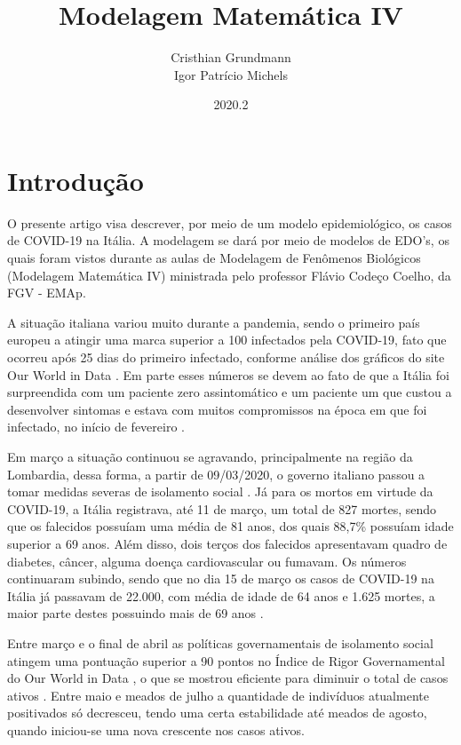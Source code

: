 \documentclass{article}
\title{Modelagem Matemática IV}
\author{Cristhian Grundmann \\
Igor Patrício Michels}
\date{2020.2}
\begin{document}
\maketitle

\section{Introdução}

O presente artigo visa descrever, por meio de um modelo epidemiológico, os casos de COVID-19 na Itália. A modelagem se dará por meio de modelos de EDO's, os quais foram vistos durante as aulas de Modelagem de Fenômenos Biológicos (Modelagem Matemática IV) ministrada pelo professor Flávio Codeço Coelho, da FGV - EMAp.

A situação italiana variou muito durante a pandemia, sendo o primeiro país europeu a atingir uma marca superior a 100 infectados pela COVID-19, fato que ocorreu após 25 dias do primeiro infectado, conforme análise dos gráficos do site Our World in Data \cite{owid}. Em parte esses números se devem ao fato de que a Itália foi surpreendida com um paciente zero assintomático e um paciente um que custou a desenvolver sintomas e estava com muitos compromissos na época em que foi infectado, no início de fevereiro \cite{dn}\cite{cm}.

Em março a situação continuou se agravando, principalmente na região da Lombardia, dessa forma, a partir de 09/03/2020, o governo italiano passou a tomar medidas severas de isolamento social \cite{piccolomini}. Já para os mortos em virtude da COVID-19, a Itália registrava, até 11 de março, um total de 827 mortes, sendo que os falecidos possuíam uma média de 81 anos, dos quais 88,7\% possuíam idade superior a 69 anos. Além disso, dois terços dos falecidos apresentavam quadro de diabetes, câncer, alguma doença cardiovascular ou fumavam. Os números continuaram subindo, sendo que no dia 15 de março os casos de COVID-19 na Itália já passavam de 22.000, com média de idade de 64 anos e 1.625 mortes, a maior parte destes possuindo mais de 69 anos \cite{REMUZZI20201225}\cite{10.1001/jama.2020.4344}.

Entre março e o final de abril as políticas governamentais de isolamento social atingem uma pontuação superior a 90 pontos no Índice de Rigor Governamental do Our World in Data \cite{owid}, o que se mostrou eficiente para diminuir o total de casos ativos \cite{italia}. Entre maio e meados de julho a quantidade de indivíduos atualmente positivados só decresceu, tendo uma certa estabilidade até meados de agosto, quando iniciou-se uma nova crescente nos casos ativos.
\end{document}

